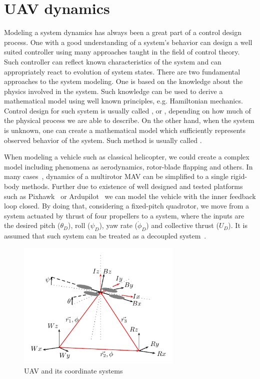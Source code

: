\section{UAV dynamics}

Modeling a system dynamics has always been a great part of a control design process. One with a good understanding of a system's behavior can design a well suited controller using many approaches taught in the field of control theory. Such controller can reflect known characteristics of the system and can appropriately react to evolution of system states. There are two fundamental approaches to the system modeling. One is based on the knowledge about the physics involved in the system. Such knowledge can be used to derive a mathematical model using well known principles, e.g. Hamiltonian mechanics. Control design for such system is usually called , or , depending on how much of the physical process we are able to describe. On the other hand, when the system is unknown, one can create a mathematical model which sufficiently represents observed behavior of the system. Such method is usually called .

When modeling a vehicle such as classical helicopter, we could create a complex model including phenomena as aerodynamics, rotor-blade flapping and others. In many cases~\citep{alexis2014robust}\citep{mahony2012multirotor}, dynamics of a multirotor MAV can be simplified to a single rigid-body methods. Further due to existence of well designed and tested platforms such as Pixhawk~\citep{pixhawk} or Ardupilot~\citep{ardupilot} we can model the vehicle with the inner feedback loop closed. By doing that, considering a fixed-pitch quadrotor, we move from a system actuated by thrust of four propellers to a system, where the inputs are the desired pitch ($\theta_D$), roll ($\psi_D$), yaw rate ($\dot{\phi}_D$) and collective thrust ($U_D$). It is assumed that such system can be treated as a decoupled system~\citep{mahony2012multirotor}.

\begin{figure}[!h]
\centering
\includegraphics[width=0.7\textwidth]{fig/coordinate_system.pdf}
\caption{UAV and its coordinate systems}
\label{fig:coordinate_system}
\end{figure}

